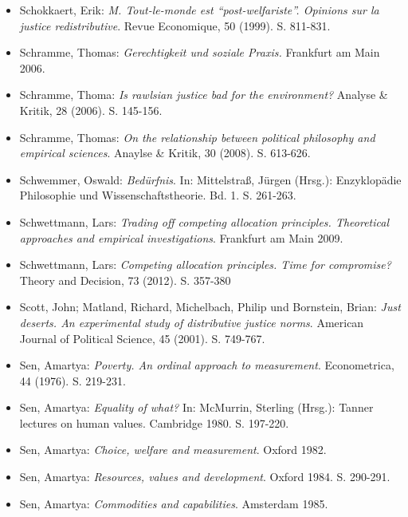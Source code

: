 \documentclass[a4paper]{thesis}
\begin{document}
\begin{itemize}[leftmargin=1.5em,label={},itemindent=-1.5em, itemsep=-1ex]
\item Schokkaert, Erik: \textit{M. Tout-le-monde est \enquote{post-welfariste}. Opinions sur la justice redistributive}. Revue Economique, 50 (1999). S. 811-831.

\item Schramme, Thomas: \textit{Gerechtigkeit und soziale Praxis.} Frankfurt am Main 2006.

\item Schramme, Thoma: \textit{Is rawlsian justice bad for the environment?} Analyse \& Kritik, 28 (2006). S. 145-156.

\item Schramme, Thomas: \textit{On the relationship between political philosophy and empirical sciences}. Anaylse \& Kritik, 30 (2008). S. 613-626.

\item Schwemmer, Oswald: \textit{Bedürfnis}. In: Mittelstraß, Jürgen (Hrsg.): Enzyklopädie Philosophie und Wissenschaftstheorie. Bd. 1. S. 261-263.

\item Schwettmann, Lars: \textit{Trading off competing allocation principles. Theoretical approaches and empirical investigations}. Frankfurt am Main 2009.

\item Schwettmann, Lars: \textit{Competing allocation principles. Time for compromise?} Theory and Decision, 73 (2012). S. 357-380

\item Scott, John; Matland, Richard, Michelbach, Philip und Bornstein, Brian: \textit{Just deserts. An experimental study of distributive justice norms}. American Journal of Political Science, 45 (2001). S. 749-767.

\item Sen, Amartya: \textit{Poverty. An ordinal approach to measurement}. Econometrica, 44 (1976). S. 219-231.

\item Sen, Amartya: \textit{Equality of what?} In: McMurrin, Sterling (Hrsg.): Tanner lectures on human values. Cambridge 1980. S. 197-220.

\item Sen, Amartya: \textit{Choice, welfare and measurement}. Oxford 1982.

\item Sen, Amartya: \textit{Resources, values and development}. Oxford 1984. S. 290-291.

\item Sen, Amartya: \textit{Commodities and capabilities}. Amsterdam 1985.


\end{itemize}
\end{document}
